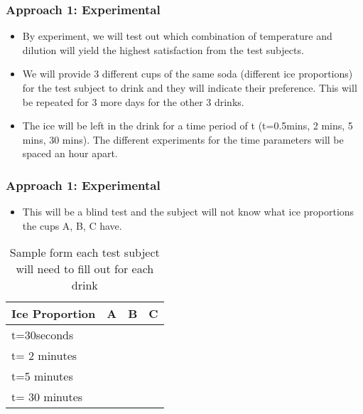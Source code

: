 \documentclass[compress,handout,10pt]{beamer}
\let\olditem\item
\renewcommand{\item}{\setlength{\itemsep}{0.5\baselineskip}\olditem}
\begin{document}
\begin{frame}
    \frametitle{Approach 1: Experimental}

\begin {itemize}
\item By experiment, we will test out which combination of temperature and dilution will yield the highest satisfaction from the test subjects.
\item We will provide 3 different cups of the same soda (different ice proportions) for the test subject to drink and they will indicate their preference. This will be repeated for 3 more days for the other 3 drinks.
\item The ice will be left in the drink for a time period of t (t=0.5mins, 2 mins, 5 mins, 30 mins). The different experiments for the time parameters will be spaced an hour apart.
\end{itemize}
\end{frame}

\begin{frame}
    \frametitle{Approach 1: Experimental}

\begin {itemize}

\item This will be a blind test and the subject will not know what ice proportions the cups A, B, C have.
\end{itemize}
\vspace{6pt}

\begin{table}[ h]
\centering
\begin{tabular}{ l | c|c|c }
  Ice Proportion & A  & B & C  \\
\hline  
t=30seconds & & &\\ 
\hline  
t= 2 minutes & & &\\ 
\hline  
t=5 minutes  & & &\\ 
\hline  
t= 30 minutes & & &\\ 
\hline  
   
 \end{tabular}
\caption{Sample form each test subject will need to fill out for each drink}

\end{table}

\end{frame}
\end{document}
